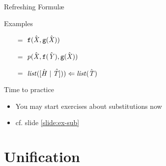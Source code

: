 \documentclass[presentation]{beamer}\mode<presentation>{\usetheme{AMSBolognaFC}}
\begin{document}
\begin{frame}[allowframebreaks]{Refreshing Formul\ae{}}
\begin{exampleblock}{Examples}
\begin{multicols}{2}
\begin{itemize}
                \item[$=$] $\mathtt{f}(\hat{\mathit{X}}, \mathtt{g}(\hat{\mathit{X}}))$
                \item[$=$] $\text{\textit{p}}(\hat{\mathit{X}}, \mathtt{f}(\hat{\mathit{Y}}), \mathtt{g}(\hat{\mathit{X}}))$
                \item[$=$] $\text{\textit{list}}([\hat{\mathit{H}} \mid \hat{\mathit{T} ]})) \Leftarrow \text{\textit{list}}(\hat{\mathit{T}})$
            \end{itemize}
        \end{multicols}
    \end{exampleblock}
\end{frame}

\begin{frame}
    \begin{block}{Time to practice}
        \begin{itemize}
            \item You may start exercises about \alert{substitutions} now
            \item cf. slide \ref{slide:ex-sub}
        \end{itemize}
    \end{block}
\end{frame}

\section{Unification}
\end{document}
